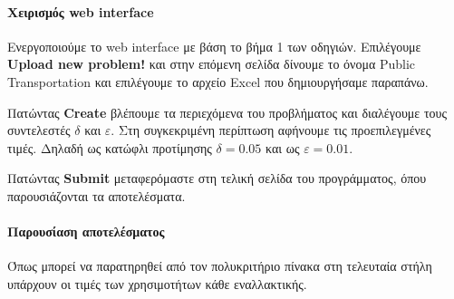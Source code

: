 \documentclass[11pt,a4paper,titlepage]{article}
\numberwithin{equation}{section}
\begin{document}
\paragraph{Χειρισμός web interface}
Ενεργοποιούμε το web interface με βάση το βήμα 1 των οδηγιών. Επιλέγουμε \textbf{Upload new problem!} και στην επόμενη σελίδα δίνουμε το όνομα Public Transportation και επιλέγουμε το αρχείο Excel που δημιουργήσαμε παραπάνω.

Πατώντας \textbf{Create} βλέπουμε τα περιεχόμενα του προβλήματος και διαλέγουμε τους συντελεστές $δ$ και $ε$. Στη συγκεκριμένη περίπτωση αφήνουμε τις προεπιλεγμένες τιμές. Δηλαδή ως κατώφλι προτίμησης $δ = 0.05$ και ως $ε = 0.01$.

Πατώντας \textbf{Submit} μεταφερόμαστε στη τελική σελίδα του προγράμματος, όπου παρουσιάζονται τα αποτελέσματα.

\paragraph{Παρουσίαση αποτελέσματος}
Όπως μπορεί να παρατηρηθεί από τον πολυκριτήριο πίνακα στη τελευταία στήλη υπάρχουν οι τιμές των χρησιμοτήτων κάθε εναλλακτικής.
\end{document}
